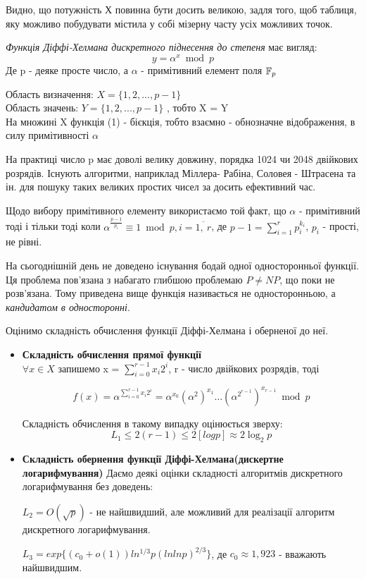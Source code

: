 Видно, що потужність $Х$ повинна бути досить великою, задля того, щоб таблиця, яку можливо побудувати містила у собі мізерну часту усіх можливих точок.

\begin{mydef}
\textit{Функція Діффі-Хелмана дискретного піднесення до степеня} має вигляд:
\[ y = \alpha^x \bmod p \] 
Де p - деяке просте число, а $\alpha$ - примітивний елемент поля $\mathbb F_{p}$
\end{mydef}
Область визначення: $X = \{1,2,...,p-1\}$ \\
Область значень: $Y = \{1,2,...,p-1\}$ , тобто X = Y \\
На множині X функція (1) - бієкція, тобто взаємно - обнозначне відображення, в силу примітивності $\alpha$

На практиці число p має доволі велику довжину, порядка 1024 чи 2048 двійкових розрядів. Існують алгоритми, наприклад Міллера- Рабіна, Соловея - Штрасена та ін. для пошуку таких великих простих чисел за досить ефективний час.

Щодо вибору примітивного елементу використаємо той факт, що $\alpha$ - примітивний тоді і тільки тоді коли $\alpha^\frac{p-1}{p_{i}}\equiv 1 \bmod p, i = \overline{1,\ r}$, 
де $p-1 = \sum_{i=1}^r p_i^{k_i}$, $p_{i}$ - прості, не рівні.

\begin{remark}
На сьогоднішній день не доведено існування бодай одної односторонньої функції. Ця проблема пов'язана з набагато глибшою проблемаю $P \neq NP$, що поки не розв'язана. Тому приведена вище функція називається не односторонньою, а \textit{кандидатом в односторонні}.
\end{remark}
Оцінимо складність обчислення функції Діффі-Хелмана і оберненої до неї.
\begin{itemize}

\item \textbf{Складність обчислення прямої функції}\\
$\forall x \in X $ запишемо x = $\sum_{i=0}^{r-1} x_i2^i $, r - число двійкових розрядів, тоді

\[f(x) = \alpha^{\sum_{i=0}^{r-1} x_i2^i} = \alpha^{x_0}(\alpha^{2})^{x_1}\dots(\alpha^{2^{r-1}})^{x_{r-1}} \bmod p\]

Складність обчислення в такому випадку оцінюється зверху: 
\[L_1 \leq 2(r-1) \leq 2[log p] \approx 2\log_2 p\]

\item \textbf{Складність обернення функції Діффі-Хелмана(дискертне логарифмування)}
Даємо деякі оцінки складності алгоритмів дискретного логарифмування без доведень:

$L_2 = O( \sqrt{p})$ - не найшвидший, але можливий для реалізації алгоритм дискретного логарифмування.

$L_3 = exp\{(c_0 + o(1)) ln^{1/3}p(lnlnp)^{2/3}\}$, де $c_0 \approx 1,923$ - вважають найшвидшим.

\end{itemize}

